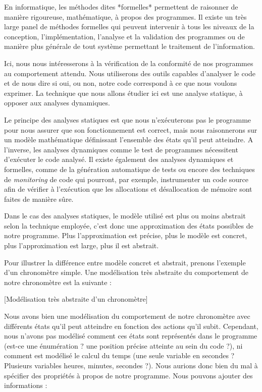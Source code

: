 
En informatique, les méthodes dites *formelles* permettent
 de raisonner de manière rigoureuse, mathématique, à propos des
programmes. Il existe un très large panel de méthodes formelles qui peuvent
intervenir à tous les niveaux de la conception, l'implémentation, l'analyse et
la validation des programmes ou de manière plus générale de tout système
permettant le traitement de l'information.



Ici, nous nous intéresserons à la vérification de la conformité de nos programmes
au comportement attendu. Nous utiliserons
des outils capables d'analyser le code et de nous dire si oui, ou non, notre
code correspond à ce que nous voulons exprimer. La technique que nous allons
étudier ici est une analyse statique, à opposer aux analyses dynamiques.



Le principe des analyses statiques est que nous n'exécuterons pas le programme
pour nous assurer que son fonctionnement est correct, mais nous raisonnerons sur
un modèle mathématique définissant l'ensemble des états qu'il peut atteindre.
A l'inverse, les analyses dynamiques comme le test de programmes nécessitent
d'exécuter le code analysé. Il existe également des analyses dynamiques et
formelles, comme de la génération automatique de tests ou encore des techniques de
{\it monitoring} de code qui pourront, par exemple, instrumenter un code source afin de
vérifier à l'exécution que les allocations et désallocation de mémoire sont faites
de manière sûre.



Dans le cas des analyses statiques, le modèle utilisé est plus ou moins
abstrait selon la technique employée, c'est donc une approximation des états
possibles de notre programme. Plus l'approximation est précise, plus le modèle est
concret, plus l'approximation est large, plus il est abstrait.



Pour illustrer la différence entre modèle concret et abstrait, prenons
l'exemple d'un chronomètre simple. Une modélisation très abstraite du
comportement de notre chronomètre est la suivante :


[Modélisation très abstraite d'un chronomètre]


Nous avons bien une modélisation du comportement de notre chronomètre avec
différents états qu'il peut atteindre en fonction des actions qu'il subit.
Cependant, nous n'avons pas modélisé comment ces états sont
représentés dans le programme (est-ce une énumération ? une position précise
atteinte au sein du code ?), ni comment est modélisé le calcul du temps (une seule
variable en secondes ? Plusieurs variables heures, minutes, secondes ?). Nous
aurions donc bien du mal à spécifier des propriétés à propos de notre programme.
Nous pouvons ajouter des informations :




